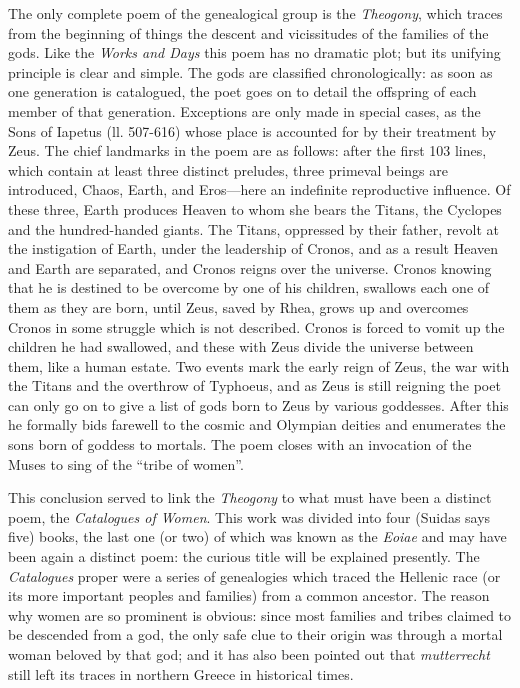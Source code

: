 The only complete poem of the genealogical group is the \emph{Theogony}, which
traces from the beginning of things the descent and vicissitudes of the
families of the gods. Like the \emph{Works and Days} this poem has no dramatic
plot; but its unifying principle is clear and simple. The gods are classified
chronologically: as soon as one generation is catalogued, the poet goes on to
detail the offspring of each member of that generation. Exceptions are only
made in special cases, as the Sons of Iapetus (ll. 507-616) whose place is
accounted for by their treatment by Zeus. The chief landmarks in the poem are
as follows: after the first 103 lines, which contain at least three distinct
preludes, three primeval beings are introduced, Chaos, Earth, and
Eros—here an indefinite reproductive influence. Of these three, Earth
produces Heaven to whom she bears the Titans, the Cyclopes and the
hundred-handed giants. The Titans, oppressed by their father, revolt at the
instigation of Earth, under the leadership of Cronos, and as a result Heaven
and Earth are separated, and Cronos reigns over the universe. Cronos knowing
that he is destined to be overcome by one of his children, swallows each one of
them as they are born, until Zeus, saved by Rhea, grows up and overcomes Cronos
in some struggle which is not described. Cronos is forced to vomit up the
children he had swallowed, and these with Zeus divide the universe between
them, like a human estate. Two events mark the early reign of Zeus, the war
with the Titans and the overthrow of Typhoeus, and as Zeus is still reigning
the poet can only go on to give a list of gods born to Zeus by various
goddesses. After this he formally bids farewell to the cosmic and Olympian
deities and enumerates the sons born of goddess to mortals. The poem closes
with an invocation of the Muses to sing of the “tribe of women”.

This conclusion served to link the \emph{Theogony} to what must have been a
distinct poem, the \emph{Catalogues of Women}. This work was divided into four
(Suidas says five) books, the last one (or two) of which was known as the
\emph{Eoiae} and may have been again a distinct poem: the curious title will be
explained presently. The \emph{Catalogues} proper were a series of genealogies
which traced the Hellenic race (or its more important peoples and families)
from a common ancestor. The reason why women are so prominent is obvious: since
most families and tribes claimed to be descended from a god, the only safe clue
to their origin was through a mortal woman beloved by that god; and it has also
been pointed out that \emph{mutterrecht} still left its traces in northern
Greece in historical times.

